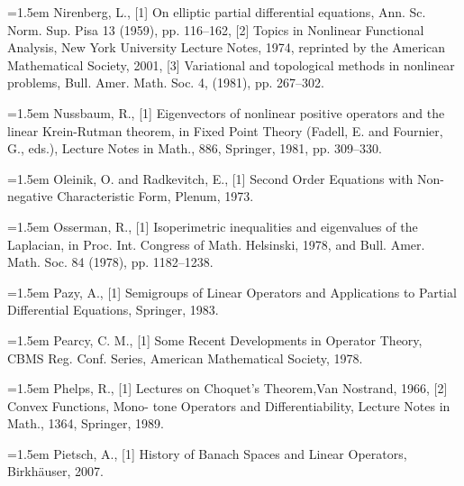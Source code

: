 \noindent\hangindent=1.5em Nirenberg, L., \hypertarget{ref:Nirenberg-1}{[1]} On elliptic partial differential equations, Ann. Sc. Norm. Sup. Pisa 13 (1959), pp. 116--162, \hypertarget{ref:Nirenberg-2}{[2]} Topics in Nonlinear Functional Analysis, New York University Lecture Notes, 1974, reprinted by the American Mathematical Society, 2001, \hypertarget{ref:Nirenberg-3}{[3]} Variational and topological methods in nonlinear problems, Bull. Amer. Math. Soc. 4, (1981), pp. 267--302.\par{}
\noindent\hangindent=1.5em Nussbaum, R., \hypertarget{ref:Nussbaum-1}{[1]} Eigenvectors of nonlinear positive operators and the linear Krein-Rutman theorem, in Fixed Point Theory (Fadell, E. and Fournier, G., eds.), Lecture Notes in Math., 886, Springer, 1981, pp. 309--330.\par{}
\noindent\hangindent=1.5em Oleinik, O. and Radkevitch, E., \hypertarget{ref:OleinikRadkevitch-1}{[1]} Second Order Equations with Non-negative Characteristic Form, Plenum, 1973.\par{}
\noindent\hangindent=1.5em Osserman, R., \hypertarget{ref:Osserman-1}{[1]} Isoperimetric inequalities and eigenvalues of the Laplacian, in Proc. Int. Congress of Math. Helsinski, 1978, and Bull. Amer. Math. Soc. 84 (1978), pp. 1182--1238.\par{}
\noindent\hangindent=1.5em Pazy, A., \hypertarget{ref:Pazy-1}{[1]} Semigroups of Linear Operators and Applications to Partial Differential Equations, Springer, 1983.\par{}
\noindent\hangindent=1.5em Pearcy, C. M., \hypertarget{ref:Pearcy-1}{[1]} Some Recent Developments in Operator Theory, CBMS Reg. Conf. Series, American Mathematical Society, 1978.\par{}
\noindent\hangindent=1.5em Phelps, R., \hypertarget{ref:Phelps-1}{[1]} Lectures on Choquet's Theorem,Van Nostrand, 1966, \hypertarget{ref:Phelps-2}{[2]} Convex Functions, Mono- tone Operators and Differentiability, Lecture Notes in Math., 1364, Springer, 1989.\par{}
\noindent\hangindent=1.5em Pietsch, A., \hypertarget{ref:Pietsch-1}{[1]} History of Banach Spaces and Linear Operators, Birkhäuser, 2007.\par{}
